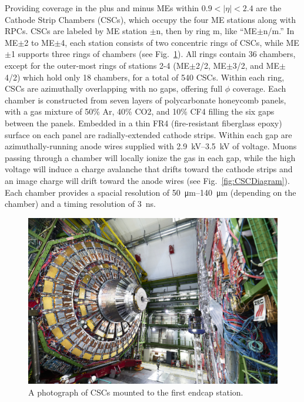 
Providing coverage in the plus and minus MEs within $0.9<|\eta|<2.4$ are the Cathode Strip Chambers (CSCs), which occupy the four ME stations along with RPCs. CSCs are labeled by ME station $\pm$n, then by ring m, like ``ME$\pm$n/m.'' In ME$\pm$2 to ME$\pm$4, each station consists of two concentric rings of CSCs, while ME$\pm$1 supports three rings of chambers (see Fig.~\ref{fig:CSC}). All rings contain 36 chambers, except for the outer-most rings of stations 2-4 (ME$\pm$2/2, ME$\pm$3/2, and ME$\pm$4/2) which hold only 18 chambers, for a total of 540 CSCs. Within each ring, CSCs are azimuthally overlapping with no gaps, offering full $\phi$ coverage. Each chamber is constructed from seven layers of polycarbonate honeycomb panels, with a gas mixture of 50\% Ar, 40\% CO2, and 10\% CF4 filling the six gaps between the panels. Embedded in a thin FR4 (fire-resistant fiberglass epoxy) surface on each panel are radially-extended cathode strips. Within each gap are azimuthally-running anode wires supplied with \SIrange{2.9}{3.5}{kV} of voltage. Muons passing through a chamber will locally ionize the gas in each gap, while the high voltage will induce a charge avalanche that drifts toward the cathode strips and an image charge will drift toward the anode wires (see Fig.~\ref{fig:CSCDiagram}). Each chamber provides a spacial resolution of \SIrange{50}{140}{\micro\meter} (depending on the chamber) and a timing resolution of \SI{3}{ns}.

\begin{figure}[H]
    \centering
    \includegraphics[width=1\textwidth]{Images/CMS/CSC.jpg}
    \caption{A photograph of CSCs mounted to the first endcap station.}
    \label{fig:CSC}
\end{figure}


